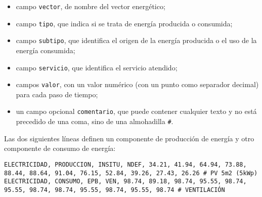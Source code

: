 \documentclass[10pt,notitlepage,oneside,a4paper]{article}
\begin{document}
\begin{itemize}
\item campo \texttt{vector}, de nombre del vector energético;
\item campo \texttt{tipo}, que indica si se trata de energía producida o consumida;
\item campo \texttt{subtipo}, que identifica el origen de la energía producida o el uso de la energía consumida;
\item campo \texttt{servicio}, que identifica el servicio atendido;
\item campos \texttt{valor}, con un valor numérico (con un punto como separador decimal) para cada paso de tiempo;
\item un campo opcional \texttt{comentario}, que puede contener cualquier texto y no está precedido de una coma, sino de una almohadilla \texttt{\#}.
\end{itemize}

Las dos siguientes líneas definen un componente de producción de energía y otro componente de consumo de energía:

\begin{lstlisting}
ELECTRICIDAD, PRODUCCION, INSITU, NDEF, 34.21, 41.94, 64.94, 73.88, 88.44, 88.64, 91.04, 76.15, 52.84, 39.26, 27.43, 26.26 # PV 5m2 (5kWp)
ELECTRICIDAD, CONSUMO, EPB, VEN, 98.74, 89.18, 98.74, 95.55, 98.74, 95.55, 98.74, 98.74, 95.55, 98.74, 95.55, 98.74 # VENTILACIÓN
\end{lstlisting}
\end{document}
